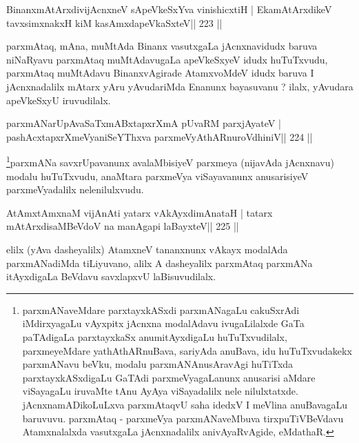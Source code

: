 \begin{shl}
BinanxmAtArxdivijAcnxneV sApeVkeSxYva vinishicxtiH |
EkamAtArxdikeV tavxsimxnakxH kiM kasAmxdapeVkaSxteV\hfill || 223 ||
\end{shl}

\begin{artha}
parxmAtaq, mAna, muMtAda Binanx vasutxgaLa jAcnxnavidudx baruva niNaRyavu parxmAtaq muMtAdavugaLa apeVkeSxyeV idudx huTuTxvudu, parxmAtaq muMtAdavu BinanxvAgirade AtamxvoMdeV idudx baruva I jAcnxnadalilx mAtarx yAru yAvudariMda Enanunx bayasuvanu ? ilalx, yAvudara apeVkeSxyU iruvudilalx.
\end{artha}


\begin{shl}
parxmANarUpAvaSaTxmABxtapxrXmA pUvaRM parxjAyateV |
pashAcxtapxrXmeVyaniSeYThxva parxmeVyAthARnuroVdhiniV\hfill || 224 ||
\end{shl}

\begin{artha}
\footnote[1]{parxmANaveMdare parxtayxkASxdi parxmANagaLu cakuSxrAdi iMdirxyagaLu vAyxpitx jAcnxna modalAdavu ivugaLilalxde GaTa paTAdigaLa parxtayxkaSx anumitAyxdigaLu huTuTxvudilalx, parxmeyeMdare yathAthARnu\-Bava, sariyAda anuBava, idu huTuTxvudakekx parxmANavu beVku, modalu parxmANAnusAravAgi huTiTxda parxtayxkASxdigaLu GaTAdi parxmeVyagaLanunx anusarisi aMdare viSayagaLu iruvaMte tAnu AyAya viSayadalilx nele nilulxtatxde. jAcnxnamADikoLuLxva parxmAtaqvU saha idedxV I meVlina anuBavagaLu baruvuvu. parxmAtaq - parxmeVya parxmANaveMbuva tirxpuTiVBeVdavu Atamxnalalxda vasutxgaLa jAcnxnadalilx anivAyaRvAgide, eMdathaR.}parxmANa savxrUpavanunx avalaMbisiyeV parxmeya (nijavAda jAcnxnavu) modalu huTuTxvudu, anaMtara parxmeVya viSayavanunx anusarisiyeV parxmeVyadalilx nelenilulxvudu.
\end{artha}


\begin{shl}
AtAmx\s\s tAmxnaM vijAnAti yatarx vAkAyxdimAnataH |
tatarx mAtArxdisaMBeVdoV na manAgapi laBayxteV\hfill || 225 ||
\end{shl}

\begin{artha}
elilx (yAva dasheyalilx) AtamxneV tananxnunx vAkayx modalAda parxmANadiMda tiLiyuvano, alilx A dasheyalilx parxmAtaq parxmANa itAyxdigaLa BeVdavu savxlapxvU laBisuvudilalx.
\end{artha}

